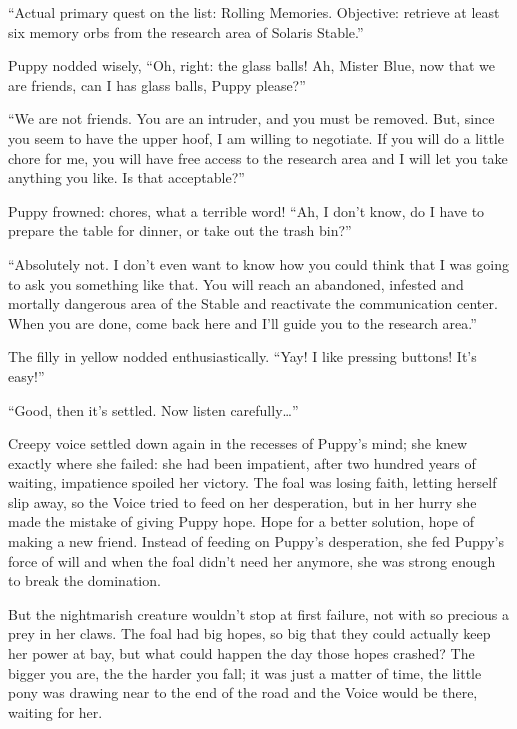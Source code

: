``Actual primary quest on the list: Rolling Memories. Objective: retrieve at least six memory orbs from the research area of Solaris Stable.''

Puppy nodded wisely, ``Oh, right: the glass balls! Ah, Mister Blue, now that we are friends, can I has glass balls, Puppy please?''

``We are not friends. You are an intruder, and you must be removed. But, since you seem to have the upper hoof, I am willing to negotiate. If you will do a little chore for me, you will have free access to the research area and I will let you take anything you like. Is that acceptable?''

Puppy frowned: chores, what a terrible word! ``Ah, I don't know, do I have to prepare the table for dinner, or take out the trash bin?''

``Absolutely not. I don't even want to know how you could think that I was going to ask you something like that. You will reach an abandoned, infested and mortally dangerous area of the Stable and reactivate the communication center. When you are done, come back here and I'll guide you to the research area.''

The filly in yellow nodded enthusiastically. ``Yay! I like pressing buttons! It's easy!''

``Good, then it's settled. Now listen carefully\dots''

\horizonline

\englishunknowndaytimeplace

Creepy voice settled down again in the recesses of Puppy's mind; she knew exactly where she failed: she had been impatient, after two hundred years of waiting, impatience spoiled her victory. The foal was losing faith, letting herself slip away, so the Voice tried to feed on her desperation, but in her hurry she made the mistake of giving Puppy hope. Hope for a better solution, hope of making a new friend. Instead of feeding on Puppy's desperation, she fed Puppy's force of will and when the foal didn't need her anymore, she was strong enough to break the domination.

But the nightmarish creature wouldn't stop at first failure, not with so precious a prey in her claws. The foal had big hopes, so big that they could actually keep her power at bay, but what could happen the day those hopes crashed? The bigger you are, the the harder you fall; it was just a matter of time, the little pony was drawing near to the end of the road and the Voice would be there, waiting for her.


